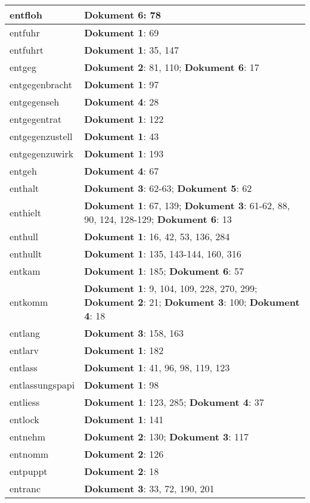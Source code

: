 \documentclass[a5paper]{article}
\begin{document}
\begin{longtable}[l]{|l|p{3in}|}
\hline
entfloh & \textbf{Dokument 6}: 78 \\
\hline
entfuhr & \textbf{Dokument 1}: 69 \\
\hline
entfuhrt & \textbf{Dokument 1}: 35, 147 \\
\hline
entgeg & \textbf{Dokument 2}: 81, 110; \textbf{Dokument 6}: 17 \\
\hline
entgegenbracht & \textbf{Dokument 1}: 97 \\
\hline
entgegenseh & \textbf{Dokument 4}: 28 \\
\hline
entgegentrat & \textbf{Dokument 1}: 122 \\
\hline
entgegenzustell & \textbf{Dokument 1}: 43 \\
\hline
entgegenzuwirk & \textbf{Dokument 1}: 193 \\
\hline
entgeh & \textbf{Dokument 4}: 67 \\
\hline
enthalt & \textbf{Dokument 3}: 62-63; \textbf{Dokument 5}: 62 \\
\hline
enthielt & \textbf{Dokument 1}: 67, 139; \textbf{Dokument 3}: 61-62, 88, 90, 124, 128-129; \textbf{Dokument 6}: 13 \\
\hline
enthull & \textbf{Dokument 1}: 16, 42, 53, 136, 284 \\
\hline
enthullt & \textbf{Dokument 1}: 135, 143-144, 160, 316 \\
\hline
entkam & \textbf{Dokument 1}: 185; \textbf{Dokument 6}: 57 \\
\hline
entkomm & \textbf{Dokument 1}: 9, 104, 109, 228, 270, 299; \textbf{Dokument 2}: 21; \textbf{Dokument 3}: 100; \textbf{Dokument 4}: 18 \\
\hline
entlang & \textbf{Dokument 3}: 158, 163 \\
\hline
entlarv & \textbf{Dokument 1}: 182 \\
\hline
entlass & \textbf{Dokument 1}: 41, 96, 98, 119, 123 \\
\hline
entlassungspapi & \textbf{Dokument 1}: 98 \\
\hline
entliess & \textbf{Dokument 1}: 123, 285; \textbf{Dokument 4}: 37 \\
\hline
entlock & \textbf{Dokument 1}: 141 \\
\hline
entnehm & \textbf{Dokument 2}: 130; \textbf{Dokument 3}: 117 \\
\hline
entnomm & \textbf{Dokument 2}: 126 \\
\hline
entpuppt & \textbf{Dokument 2}: 18 \\
\hline
entranc & \textbf{Dokument 3}: 33, 72, 190, 201 \\

\end{longtable}
\end{document}
